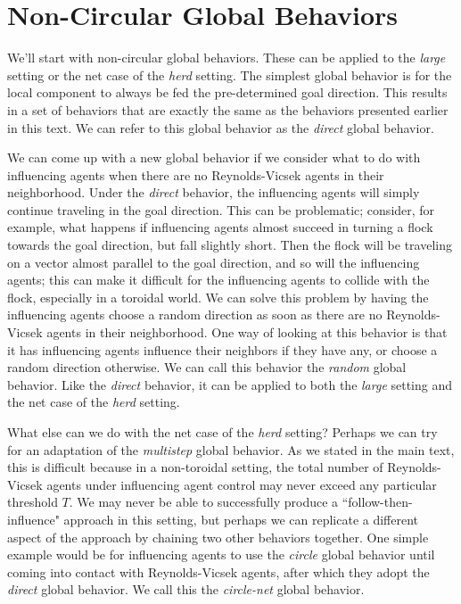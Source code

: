 \section{Non-Circular Global Behaviors}
We'll start with non-circular global behaviors.
These can be applied to the \textit{large} setting or the net case of the
\textit{herd} setting.
The simplest global behavior is for the local component to always be fed the
pre-determined goal direction.
This results in a set of behaviors that are exactly the same as the behaviors
presented earlier in this text.
We can refer to this global behavior as the \textit{direct} global behavior.

We can come up with a new global behavior if we consider what to do with
influencing agents when there are no Reynolds-Vicsek agents in their
neighborhood.
Under the \textit{direct} behavior, the influencing agents will simply continue
traveling in the goal direction.
This can be problematic; consider, for example, what happens if influencing
agents almost succeed in turning a flock towards the goal direction, but fall
slightly short.
Then the flock will be traveling on a vector almost parallel to the goal
direction, and so will the influencing agents; this can make it difficult for
the influencing agents to collide with the flock, especially in a toroidal
world.
We can solve this problem by having the influencing agents choose a random
direction as soon as there are no Reynolds-Vicsek agents in their neighborhood.
One way of looking at this behavior is that it has influencing agents influence
their neighbors if they have any, or choose a random direction otherwise.
We can call this behavior the \textit{random} global behavior.
Like the \textit{direct} behavior, it can be applied to both the \textit{large}
setting and the net case of the \textit{herd} setting.

What else can we do with the net case of the \textit{herd} setting?
Perhaps we can try for an adaptation of the \textit{multistep} global behavior.
As we stated in the main text, this is difficult because in a non-toroidal
setting, the total number of Reynolds-Vicsek agents under influencing agent
control may never exceed any particular threshold $T$.
We may never be able to successfully produce a ``follow-then-influence"
approach in this setting, but perhaps we can replicate a different aspect of
the approach by chaining two other behaviors together.
One simple example would be for influencing agents to use the \textit{circle}
global behavior until coming into contact with Reynolds-Vicsek agents, after
which they adopt the \textit{direct} global behavior.
We call this the \textit{circle-net} global behavior.

